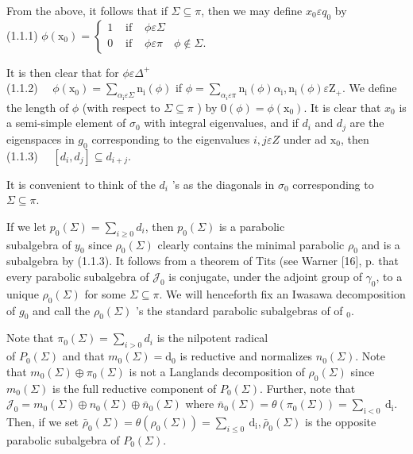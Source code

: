 \documentclass[10pt]{article}
\begin{document}
From the above, it follows that if $\Sigma \subseteq \pi$, then we may define $x_{0} \varepsilon q_{0}$ by\\
(1.1.1) $\phi\left(\mathrm{x}_{0}\right)=\left\{\begin{array}{lllll}1 & \text { if } & \phi \varepsilon \Sigma & \\ 0 & \text { if } & \phi \varepsilon \pi & \phi \notin \Sigma .\end{array}\right.$

It is then clear that for $\phi \varepsilon \Delta^{+}$\\
(1.1.2) $\quad \phi\left(\mathrm{x}_{0}\right)=\sum_{\alpha_{\mathrm{i}} \varepsilon \Sigma} \mathrm{n}_{\mathrm{i}}(\phi)$ if $\phi=\sum_{\alpha_{i} \varepsilon \pi} \mathrm{n}_{\mathrm{i}}(\phi) \alpha_{\mathrm{i}}, \mathrm{n}_{\mathrm{i}}(\phi) \varepsilon \mathrm{Z}_{+}$. We define the length of $\phi$ (with respect to $\Sigma \subseteq \pi$ ) by $0(\phi)=\phi\left(\mathrm{x}_{0}\right)$. It is clear that $x_{0}$ is a semi-simple element of $\sigma_{0}$ with integral eigenvalues, and if $d_{i}$ and $d_{j}$ are the eigenspaces in $g_{0}$ corresponding to the eigenvalues $i, j \varepsilon Z$ under ad $\mathrm{x}_{0}$, then\\
(1.1.3) $\quad\left[d_{i}, d_{j}\right] \subseteq d_{i+j}$.

It is convenient to think of the $d_{i}$ 's as the diagonals in $\sigma_{0}$ corresponding to $\Sigma \subseteq \pi$.

If we let $p_{0}(\Sigma)=\sum_{i \geq 0} d_{i}$, then $p_{0}(\Sigma)$ is a parabolic\\
subalgebra of $y_{0}$ since $\rho_{0}(\Sigma)$ clearly contains the minimal parabolic $\rho_{0}$ and is a subalgebra by (1.1.3). It follows from a theorem of Tits (see Warner [16], p. that every parabolic subalgebra of $\mathcal{J}_{0}$ is conjugate, under the adjoint group of $\gamma_{0}$, to a unique $\rho_{0}(\Sigma)$ for some $\Sigma \subseteq \pi$. We will henceforth fix an Iwasawa decomposition of $g_{0}$ and call the $\rho_{0}(\Sigma)$ 's the standard parabolic subalgebras of of $_{0}$.

Note that $\pi_{0}(\Sigma)=\sum_{i>0} d_{i}$ is the nilpotent radical\\
of $P_{0}(\Sigma)$ and that $m_{0}(\Sigma)=\mathrm{d}_{0}$ is reductive and normalizes $n_{0}(\Sigma)$. Note that $m_{0}(\Sigma) \oplus \pi_{0}(\Sigma)$ is not a Langlands decomposition of $\rho_{0}(\Sigma)$ since $m_{0}(\Sigma)$ is the full reductive component of $P_{0}(\Sigma)$. Further, note that $\mathcal{J}_{0}=m_{0}(\Sigma) \oplus n_{0}(\Sigma) \oplus \bar{n}_{0}(\Sigma)$ where $\bar{n}_{0}(\Sigma)=\theta\left(\pi_{0}(\Sigma)\right)=\sum_{\mathrm{i}<0} \mathrm{~d}_{\mathrm{i}}$. Then, if we set $\bar{\rho}_{0}(\Sigma)=\theta\left(\rho_{0}(\Sigma)\right)=\sum_{i \leq 0} \mathrm{~d}_{\mathrm{i}}, \bar{\rho}_{0}(\Sigma)$ is the opposite parabolic subalgebra of $P_{0}(\Sigma)$.
\end{document}
